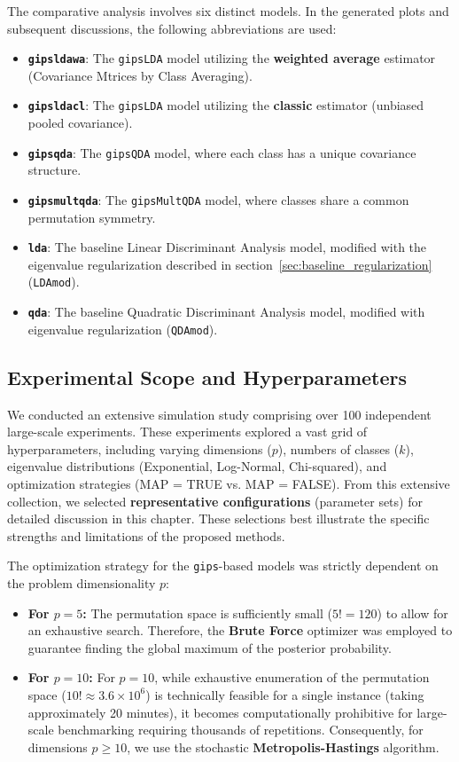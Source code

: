\documentclass[a4paper,11pt,twoside]{report}
\theoremstyle{definition}
\begin{document}
The comparative analysis involves six distinct models. In the generated plots and subsequent discussions, the following abbreviations are used:

\begin{itemize}
    \item \textbf{\texttt{gipsldawa}}: The \texttt{gipsLDA} model utilizing the \textbf{weighted average} estimator (Covariance Mtrices by Class Averaging).
    \item \textbf{\texttt{gipsldacl}}: The \texttt{gipsLDA} model utilizing the \textbf{classic} estimator (unbiased pooled covariance).
    \item \textbf{\texttt{gipsqda}}: The \texttt{gipsQDA} model, where each class has a unique covariance structure.
    \item \textbf{\texttt{gipsmultqda}}: The \texttt{gipsMultQDA} model, where classes share a common permutation symmetry.
    \item \textbf{\texttt{lda}}: The baseline Linear Discriminant Analysis model, modified with the eigenvalue regularization described in section~\ref{sec:baseline_regularization} (\texttt{LDAmod}).
    \item \textbf{\texttt{qda}}: The baseline Quadratic Discriminant Analysis model, modified with eigenvalue regularization (\texttt{QDAmod}).
\end{itemize}

\subsection{Experimental Scope and Hyperparameters}

We conducted an extensive simulation study comprising over 100 independent large-scale experiments. These experiments explored a vast grid of hyperparameters, including varying dimensions ($p$), numbers of classes ($k$), eigenvalue distributions (Exponential, Log-Normal, Chi-squared), and optimization strategies (MAP = TRUE vs. MAP = FALSE). From this extensive collection, we selected \textbf{representative configurations} (parameter sets) for detailed discussion in this chapter. These selections best illustrate the specific strengths and limitations of the proposed methods.

The optimization strategy for the \texttt{gips}-based models was strictly dependent on the problem dimensionality $p$:
\begin{itemize}
    \item \textbf{For $p=5$:} The permutation space is sufficiently small ($5! = 120$) to allow for an exhaustive search. Therefore, the \textbf{Brute Force} optimizer was employed to guarantee finding the global maximum of the posterior probability.
    \item \textbf{For $p=10$:} For $p=10$, while exhaustive enumeration of the permutation space ($10! \approx 3.6 \times 10^6$) is technically feasible for a single instance (taking approximately 20 minutes), it becomes computationally prohibitive for large-scale benchmarking requiring thousands of repetitions. Consequently, for dimensions $p \ge 10$, we use the stochastic \textbf{Metropolis-Hastings} algorithm.
\end{itemize}
\end{document}
